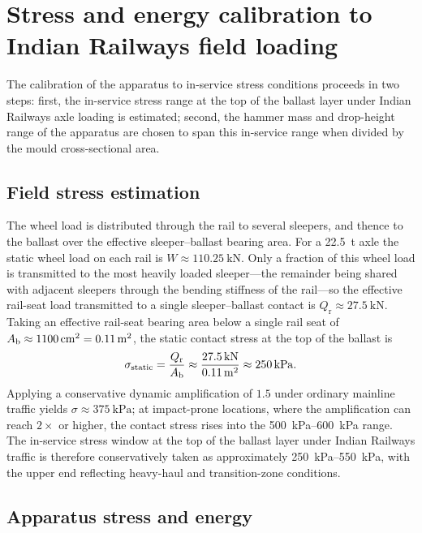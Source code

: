 \section{Stress and energy calibration to Indian Railways field loading}
\label{sec:calibration}

The calibration of the apparatus to in-service stress conditions proceeds in two steps: first, the in-service stress range at the top of the ballast layer under Indian Railways axle loading is estimated; second, the hammer mass and drop-height range of the apparatus are chosen to span this in-service range when divided by the mould cross-sectional area.

\subsection{Field stress estimation}
\label{sec:field-stress}

The wheel load is distributed through the rail to several sleepers, and thence to the ballast over the effective sleeper--ballast bearing area. For a \qty{22.5}{\tonne} axle the static wheel load on each rail is $W \approx \qty{110.25}{\kN}$. Only a fraction of this wheel load is transmitted to the most heavily loaded sleeper---the remainder being shared with adjacent sleepers through the bending stiffness of the rail---so the effective rail-seat load transmitted to a single sleeper--ballast contact is $Q_{\mathrm{r}} \approx \qty{27.5}{\kN}$. Taking an effective rail-seat bearing area below a single rail seat of $\Ab \approx \qty{1100}{\cm\squared} = \qty{0.11}{\m\squared}$, the static contact stress at the top of the ballast is
\begin{equation}
  \sigma_{\mathrm{static}} = \frac{Q_{\mathrm{r}}}{\Ab}
    \approx \frac{\qty{27.5}{\kN}}{\qty{0.11}{\m\squared}}
    \approx \qty{250}{\kPa}.
  \label{eq:field-stress}
\end{equation}
Applying a conservative dynamic amplification of $1.5$ under ordinary mainline traffic yields $\sigma \approx \qty{375}{\kPa}$; at impact-prone locations, where the amplification can reach $2\times$ or higher, the contact stress rises into the \qtyrange{500}{600}{\kPa} range. The in-service stress window at the top of the ballast layer under Indian Railways traffic is therefore conservatively taken as approximately \qtyrange{250}{550}{\kPa}, with the upper end reflecting heavy-haul and transition-zone conditions.

\subsection{Apparatus stress and energy}
\label{sec:apparatus-stress}

